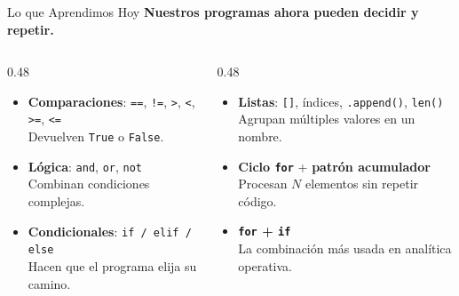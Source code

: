 \documentclass[aspectratio=169, 11pt]{beamer}
\begin{document}
\begin{frame}{Lo que Aprendimos Hoy}
  \vspace{-6pt}
  {\small\color{arcaDark}\bfseries
    Nuestros programas ahora pueden \textbf{decidir} y \textbf{repetir}.}

  \vspace{8pt}
  \begin{columns}[T]
    \begin{column}{0.48\textwidth}
      {\footnotesize
      \begin{itemize}\setlength{\itemsep}{6pt}
        \item[{\color{arcaRed}\Large\faBalanceScale}]
          \textbf{Comparaciones}: \texttt{==}, \texttt{!=},
          \texttt{>}, \texttt{<}, \texttt{>=}, \texttt{<=}\\
          {\scriptsize\color{textMuted}
            Devuelven \texttt{True} o \texttt{False}.}

        \item[{\color{arcaRed}\Large\faLink}]
          \textbf{Lógica}: \texttt{and}, \texttt{or}, \texttt{not}\\
          {\scriptsize\color{textMuted}
            Combinan condiciones complejas.}

        \item[{\color{arcaRed}\Large\faCodeBranch}]
          \textbf{Condicionales}: \texttt{if / elif / else}\\
          {\scriptsize\color{textMuted}
            Hacen que el programa elija su camino.}
      \end{itemize}
      }
    \end{column}

    \begin{column}{0.48\textwidth}
      {\footnotesize
      \begin{itemize}\setlength{\itemsep}{6pt}
        \item[{\color{arcaRed}\Large\faList}]
          \textbf{Listas}: \texttt{[]}, índices, \texttt{.append()},
          \texttt{len()}\\
          {\scriptsize\color{textMuted}
            Agrupan múltiples valores en un nombre.}

        \item[{\color{arcaRed}\Large\faSync}]
          \textbf{Ciclo \texttt{for}} + \textbf{patrón acumulador}\\
          {\scriptsize\color{textMuted}
            Procesan \(N\) elementos sin
            repetir código.}

        \item[{\color{arcaRed}\Large\faRocket}]
          \textbf{\texttt{for} + \texttt{if}}\\
          {\scriptsize\color{textMuted}
            La combinación más usada en
            analítica operativa.}
      \end{itemize}
      }
    \end{column}
  \end{columns}
\end{frame}
\end{document}
